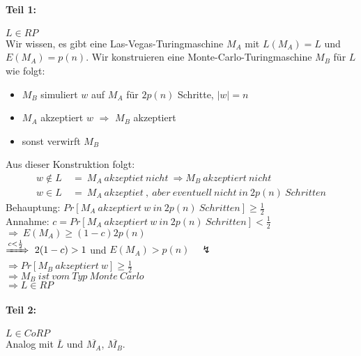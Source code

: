 \paragraph{Teil 1:}
$L \in RP$\\
Wir wissen, es gibt eine Las-Vegas-Turingmaschine $M_A$ mit $L(M_A) = L$ und $E(M_A) = p(n)$.
Wir konstruieren eine Monte-Carlo-Turingmaschine $M_B$ für $L$ wie folgt:
\begin{itemize}
	\item $M_B$ simuliert $w$ auf $M_A$ für $2p(n)$ Schritte, $|w| = n$
	\item $M_A$ akzeptiert $w$ $\Rightarrow$ $M_B$ akzeptiert
	\item sonst verwirft $M_B$
\end{itemize}
Aus dieser Konstruktion folgt:
\begin{align*}
	w \notin L\ &=\ M_A\ akzeptiet\ nicht\ \Rightarrow M_B\ akzeptiert\ nicht \\
	w \in L\ &=\ M_A\ akzeptiet\ ,\ aber\ eventuell\ nicht\ in\ 2p(n)\ Schritten
\end{align*}
Behauptung:
$Pr[M_A\ akzeptiert\ w\ in\ 2p(n)\ Schritten] \geq \frac{1}{2}$ \\
Annahme:
$c = Pr[M_A\ akzeptiert\ w\ in\ 2p(n)\ Schritten] < \frac{1}{2}$ \\
$\Rightarrow\ E(M_A) \geq (1-c)2p(n)$\\
$\xRightarrow{c < \frac{1}{2}}\ 2(1-c) > 1$ und $E(M_A) > p(n) \quad \lightning$\\
$\Rightarrow Pr[M_B\ akzeptiert\ w] \geq \frac{1}{2}$\\
$\Rightarrow M_B\ ist\ vom\ Typ\ Monte\ Carlo$\\
$\Rightarrow L \in RP$

\paragraph{Teil 2:}
$L \in CoRP$\\
Analog mit $\overline{L}$ und $\overline{M_A}$, $\overline{M_B}$.



